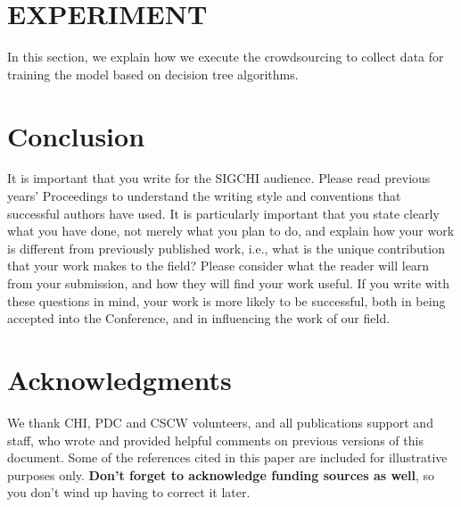 \documentclass{sigchi}
\begin{document}
\section{EXPERIMENT}

In this section, we explain how we execute the crowdsourcing to collect data for training the model based on decision tree algorithms.


\section{Conclusion}

It is important that you write for the SIGCHI audience.  Please read
previous years' Proceedings to understand the writing style and
conventions that successful authors have used.  It is particularly
important that you state clearly what you have done, not merely what
you plan to do, and explain how your work is different from previously
published work, i.e., what is the unique contribution that your work
makes to the field?  Please consider what the reader will learn from
your submission, and how they will find your work useful.  If you
write with these questions in mind, your work is more likely to be
successful, both in being accepted into the Conference, and in
influencing the work of our field.

\section{Acknowledgments}

We thank CHI, PDC and CSCW volunteers, and all publications support
and staff, who wrote and provided helpful comments on previous
versions of this document.  Some of the references cited in this paper
are included for illustrative purposes only.  \textbf{Don't forget
to acknowledge funding sources as well}, so you don't wind up
having to correct it later.

\balance



\end{document}
